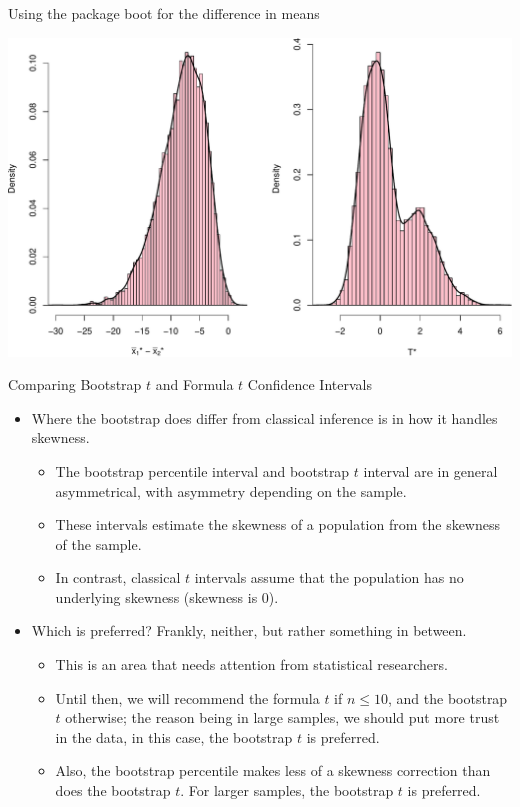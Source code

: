\documentclass[
  ignorenonframetext,
]{beamer}
\providecommand{\tightlist}{%
  \setlength{\itemsep}{0pt}\setlength{\parskip}{0pt}}
\begin{document}
\begin{frame}[fragile]{Using the package boot for the difference in
means}
\begin{center}\includegraphics[width=0.8\linewidth,height=0.45\textheight]{Week11_12_13_files/figure-beamer/unnamed-chunk-35-1} \end{center}
\normalsize
\end{frame}

\begin{frame}{Comparing Bootstrap \(t\) and Formula \(t\) Confidence
Intervals}
\protect\hypertarget{comparing-bootstrap-t-and-formula-t-confidence-intervals}{}
\begin{itemize}
\item
  Where the bootstrap does differ from classical inference is in how it
  handles skewness.

  \begin{itemize}
  \tightlist
  \item
    The bootstrap percentile interval and bootstrap \(t\) interval are
    in general asymmetrical, with asymmetry depending on the sample.
  \item
    These intervals estimate the skewness of a population from the
    skewness of the sample.
  \item
    In contrast, classical \(t\) intervals assume that the population
    has no underlying skewness (skewness is 0).
  \end{itemize}
\item
  Which is preferred? Frankly, neither, but rather something in between.

  \begin{itemize}
  \tightlist
  \item
    This is an area that needs attention from statistical researchers.
  \item
    Until then, we will recommend the formula \(t\) if \(n\leq 10\), and
    the bootstrap \(t\) otherwise; the reason being in large samples, we
    should put more trust in the data, in this case, the bootstrap \(t\)
    is preferred.
  \item
    Also, the bootstrap percentile makes less of a skewness correction
    than does the bootstrap \(t\). For larger samples, the bootstrap
    \(t\) is preferred.
  \end{itemize}
\end{itemize}
\end{frame}
\end{document}
